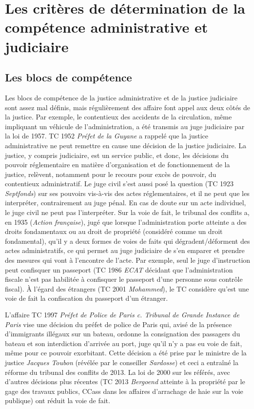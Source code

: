 \documentclass[math]{cours}
\begin{document}
\section{Les critères de détermination de la compétence administrative et judiciaire}
\subsection{Les blocs de compétence}
Les blocs de compétence de la justice administrative et de la justice judiciaire sont assez mal définis, mais régulièrement des affaire font appel aux deux côtés de la justice.
Par exemple, le contentieux des accidents de la circulation, même impliquant un véhicule de l'administration, a été transmis au juge judiciaire par la loi de 1957.
TC 1952 \emph{Préfet de la Guyane} a rappelé que la justice administrative ne peut remettre en cause une décision de la justice judiciaire.
La justice, y compris judiciaire, est un service public, et donc, les décisions du pouvoir réglementaire en matière d'organisation et de fonctionnement de la justice, relèvent, notamment pour le recours pour excès de pouvoir, du contentieux administratif.
Le juge civil s'est aussi posé la question (TC 1923 \emph{Septfonds}) sur ses pouvoirs vis-à-vis des actes réglementaires, et il ne peut que les interpréter, contrairement au juge pénal. En cas de doute sur un acte individuel, le juge civil ne peut pas l'interpréter.
Sur la voie de fait, le tribunal des conflits a, en 1935 (\emph{Action française}), jugé que lorsque l'administration porte atteinte a des droits fondamentaux ou au droit de propriété (considéré comme un droit fondamental), qu'il y a deux formes de voies de faits qui dégradent/déforment des actes administratifs, ce qui permet au juge judiciaire de s'en emparer et prendre des mesures qui vont à l'encontre de l'acte.
Par exemple, seul le juge d'instruction peut confisquer un passeport (TC 1986 \emph{ECAT} décidant que l'administration fiscale n'est pas habilitée à confisquer le passeport d'une personne sous contrôle fiscal).
À l'égard des étrangers (TC 2001 \emph{Mohammed}), le TC considère qu'est une voie de fait la confiscation du passeport d'un étranger.

L'affaire TC 1997 \emph{Préfet de Police de Paris c. Tribunal de Grande Instance de Paris} vise une décision du préfet de police de Paris qui, avisé de la présence d'immigrants illégaux sur un bateau, ordonne la consignation des passagers du bateau et son interdiction d'arrivée au port, juge qu'il n'y a pas eu voie de fait, même pour ce pouvoir exorbitant.
Cette décision a été prise par le ministre de la justice \emph{Jacques Toubon} (révélée par le conseiller \emph{Sardosse}) et ceci a entraîné la réforme du tribunal des conflits de 2013.
La loi de 2000 sur les référés, avec d'autres décisions plus récentes (TC 2013 \emph{Bergoend} atteinte à la propriété par le gage des travaux publics, CCass dans les affaires d'arrachage de haie sur la voie publique) ont réduit la voie de fait.
\end{document}

